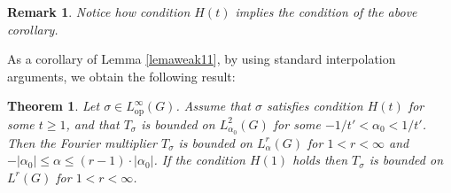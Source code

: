 \documentclass[12pt, reqno]{amsart}
\newtheorem{teo}[defi]{Theorem}
\newtheorem{rem}[defi]{Remark}
\newcommand{\1}{\mathds{1}}
\begin{document}
\begin{rem}
    Notice how condition $H(t)$ implies the condition of the above corollary. 
\end{rem}
As a corollary of Lemma \ref{lemaweak11}, by using standard interpolation arguments, we obtain the following result:

\begin{teo}
Let $\sigma \in L^\infty_{\mathrm{op}}(G)$. Assume that $\sigma$ satisfies condition $H(t)$ for some $t \geq 1$, and that $T_\sigma$
is bounded on $L^2_{\alpha_0}(G)$ for some $-1/t' < \alpha_0 < 1/t'$. Then the Fourier multiplier $T_\sigma$ is bounded on
$L^r_\alpha(G)$ for $1 < r < \infty$ and $-|\alpha_0|\leq \alpha \leq (r-1) \cdot |\alpha_0|$. If the condition $H(1)$ holds then $T_\sigma$ is bounded
on $L^r(G)$ for $1 < r < \infty$.
\end{teo}
\end{document}
